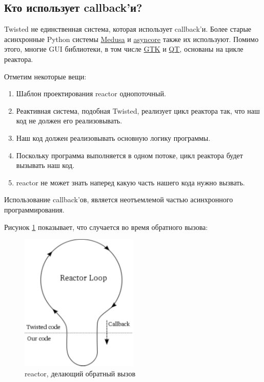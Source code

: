 \subsection{Кто использует callback'и?}

Twisted не единственная система, которая использует callback'и. 
Более старые асинхронные Python системы 
\href{http://www.nightmare.com/medusa/}{Medusa} и 
\href{http://docs.python.org/library/asyncore.html#module-asyncore}{asyncore} 
также их используют. Помимо этого, многие GUI библиотеки, в том числе    
\href{http://gtk.org/}{GTK} и \href{http://qt.nokia.com/}{QT}, 
основаны на цикле реактора.


Отметим некоторые вещи:

\begin{enumerate}
\item Шаблон проектирования reactor однопоточный.
\item Реактивная система, подобная Twisted, реализует цикл 
реактора так, что наш код не должен его реализовывать.
\item Наш код должен реализовывать основную логику программы. 
\item Поскольку программа выполняется в одном потоке, 
цикл реактора будет вызывать наш код.
\item reactor не может знать наперед какую часть нашего кода нужно вызвать.
\end{enumerate}

Использование callback'ов, является неотъемлемой 
частью асинхронного программирования.

\eject

Рисунок \ref{fig:reactor-callback} показывает, что случается во время 
обратного вызова:

\begin{figure}[h]
\begin{center}
    \includegraphics[width=0.5\textwidth]{images/reactor-callback.pdf}
    \caption{reactor, делающий обратный вызов\label{fig:reactor-callback}}
\end{center}
\end{figure}


